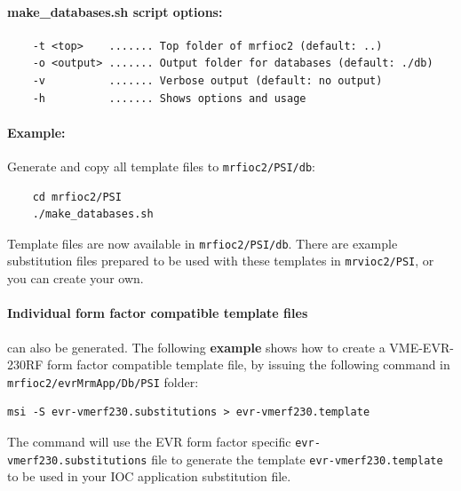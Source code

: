 \documentclass[12pt,a4paper]{article}
\let\stdsection\section
\renewcommand\section{\newpage\stdsection}
\begin{document}
\paragraph{make\_databases.sh script options:}
\begin{verbatim}
	-t <top>    ....... Top folder of mrfioc2 (default: ..)
	-o <output> ....... Output folder for databases (default: ./db)
	-v          ....... Verbose output (default: no output)
	-h          ....... Shows options and usage
\end{verbatim}

\paragraph{Example:} Generate and copy all template files to \texttt{mrfioc2/PSI/db}:
\begin{verbatim}
	cd mrfioc2/PSI
	./make_databases.sh
\end{verbatim}
Template files are now available in \texttt{mrfioc2/PSI/db}. There are example substitution files prepared to be used with these templates in \texttt{mrvioc2/PSI}, or you can create your own.

\paragraph{Individual form factor compatible template files} can also be generated. The following \textbf{example} shows how to create a VME-EVR-230RF form factor compatible template file, by issuing the following command in \newline\texttt{mrfioc2/evrMrmApp/Db/PSI} folder:

\begin{verbatim}
msi -S evr-vmerf230.substitutions > evr-vmerf230.template 
\end{verbatim}

The command will use the EVR form factor specific \newline\texttt{evr-vmerf230.substitutions}
file to generate the template \newline\texttt{evr-vmerf230.template} to be used in your IOC application substitution file.



\end{document}
